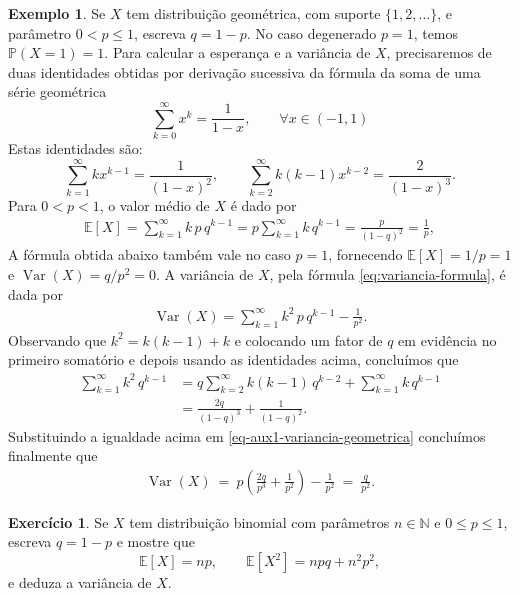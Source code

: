 \documentclass[12pt,portuguese]{article}
\theoremstyle{definition}
\newtheorem{example}[example]{Exemplo}
\newtheorem{exercise}{Exercício}
\begin{document}
\begin{example}\label{ex:geometrica}
Se \(X\) tem distribuição geométrica, com suporte \(\{1,2,\ldots\}\), e parâmetro
\(0<p\leqslant 1\), escreva \(q=1-p\). No caso degenerado \(p=1\), temos
\(\mathbb{P}(X=1)=1\). Para calcular a esperança e a variância de $X$, precisaremos
de duas identidades obtidas por derivação sucessiva da fórmula da soma de uma série geométrica
\[
\sum_{k=0}^{\infty} x^k = \frac{1}{1-x},\qquad \forall x\in (-1,1)
\]
Estas identidades são:
\[
\sum_{k=1}^{\infty} k x^{k-1} = \frac{1}{(1-x)^2},
\qquad
\sum_{k=2}^{\infty} k(k-1) x^{k-2} = \frac{2}{(1-x)^3}.
\]
Para \(0<p<1\), o valor médio de \(X\) é dado por
\[
\begin{aligned}
\mathbb{E}[X] 
= 
\sum_{k=1}^{\infty} k \, p \, q^{k-1} 
=
p \sum_{k=1}^{\infty} k \, q^{k-1} 
=
\frac{p}{(1 - q)^2} = \frac{1}{p},
\end{aligned}
\]
A fórmula obtida abaixo também vale no caso \(p=1\), fornecendo
\(\mathbb{E}[X]=1/p=1\) e \(\operatorname{Var}(X)=q/p^2=0\).
A variância de \(X\), pela fórmula \eqref{eq:variancia-formula}, é dada por
\begin{align}\label{eq-aux1-variancia-geometrica}
\operatorname{Var}(X) = \sum_{k=1}^{\infty} k^2 \, p \, q^{k-1} - \frac{1}{p^2}.
\end{align}
Observando que $k^2 = k(k-1)+k$ e colocando um fator de $q$ em evidência no primeiro somatório e
depois usando as identidades acima,
concluímos que
\[
\begin{aligned}
\sum_{k=1}^{\infty} k^2 \, q^{k-1}
&= q \sum_{k=2}^{\infty} k(k-1) \, q^{k-2} + \sum_{k=1}^{\infty} k \, q^{k-1} \\
&= \frac{2q}{(1 - q)^3} + \frac{1}{(1 - q)^2}.
\end{aligned}
\]
Substituindo a igualdade acima em \eqref{eq-aux1-variancia-geometrica} concluímos finalmente que 
\[
\begin{aligned}
\operatorname{Var}(X) \ = \ p \left(\frac{2q}{p^3} + \frac{1}{p^2}\right) - \frac{1}{p^2} \ 
= \ \frac{q}{p^{2}}.
\end{aligned}
\]
\end{example}

\begin{exercise}\label{exercise:binomial-variancia}
Se \(X\) tem distribuição binomial com parâmetros \(n\in\mathbb{N}\) e
\(0\leqslant p\leqslant 1\), escreva \(q=1-p\) e mostre
que
\[
\mathbb{E}[X] = np, \qquad \mathbb{E}[X^2] = npq + n^2 p^2,
\]
e deduza a variância de \(X\).
\end{exercise}
\end{document}
